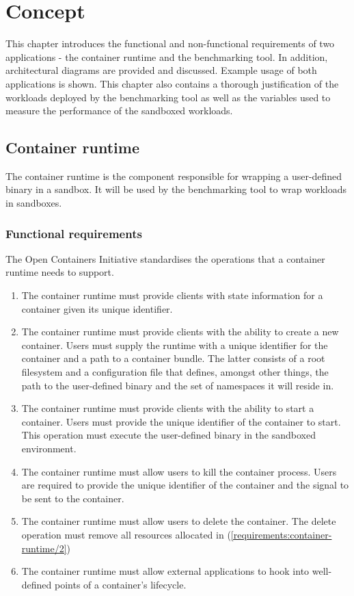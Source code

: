 \chapter{Concept}
\label{ch:concept}
This chapter introduces the functional and non-functional requirements of two 
applications - the container runtime and the benchmarking tool. 
In addition, architectural diagrams are provided and discussed. 
Example usage of both applications is shown.
This chapter also contains a thorough justification of the workloads deployed by the benchmarking tool as
well as the variables used to measure the performance of the sandboxed workloads.

\section{Container runtime}
The container runtime is the component responsible for wrapping a user-defined binary 
in a sandbox. It will be used by the benchmarking tool to wrap workloads in sandboxes.

\subsection{Functional requirements}
The Open Containers Initiative standardises the operations \cite{oci-runtime-operations} that 
a container runtime needs to support.

\begin{enumerate}[i]
\item The container runtime must provide clients with state information for a container
given its unique identifier. 
\label{requirements:container-runtime/1}
\item The container runtime must provide clients with the ability to create a new container. 
Users must supply the runtime with a unique identifier for the container and a path to a 
container bundle. The latter consists of a root filesystem and a configuration file that 
defines, amongst other things, the path to the user-defined binary and the set of namespaces
it will reside in.
\label{requirements:container-runtime/2}
\item The container runtime must provide clients with the ability to start a container. 
Users must provide the unique identifier of the container to start. 
This operation must execute the user-defined binary in the sandboxed environment.
\label{requirements:container-runtime/3}
\item The container runtime must allow users to kill the container process.
Users are required to provide the unique identifier of the container and the signal to be sent 
to the container.
\label{requirements:container-runtime/4}
\item The container runtime must allow users to delete the container.
The delete operation must remove all resources allocated in (\ref{requirements:container-runtime/2})
\label{requirements:container-runtime/5}
\item The container runtime must allow external applications to hook into well-defined points 
of a container's lifecycle.
\label{requirements:container-runtime/6}
\end{enumerate}

